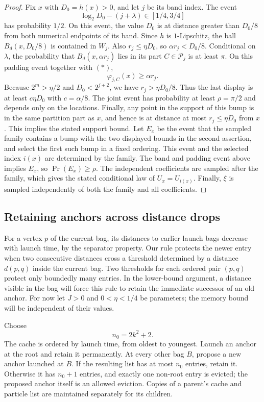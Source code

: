 \begin{proof}
Fix $x$ with $D_0=h(x)>0$, and let $j$ be its band index. The event
\[
  \log_2D_0-(j+\lambda)\in[1/4,3/4]
  \tag{*}
\]
has probability $1/2$. On this event, the value $D_0$ is at distance
greater than $D_0/8$ from both numerical endpoints of its band. Since
$h$ is $1$-Lipschitz, the ball $B_d(x,D_0/8)$ is contained in $W_j$.
Also $r_j\leq\eta D_0$, so $\alpha r_j<D_0/8$.
Conditional on $\lambda$, the probability that
$B_d(x,\alpha r_j)$ lies in its part $C\in\mathcal P_j$ is at least
$\pi$. On this padding event together with $(*)$,
\[
  \varphi_{j,C}(x)\geq\alpha r_j.
\]
Because $2^m>\eta/2$ and $D_0<2^{j+2}$, we have
$r_j>\eta D_0/8$. Thus the last display is at least
$c\eta D_0$ with $c=\alpha/8$. The joint event has probability at
least $\rho=\pi/2$ and depends only on the locations.
Finally, any point in the support of this bump is in the same partition
part as $x$, and hence is at distance at most
$r_j\leq\eta D_0$ from $x$. This implies the stated support bound.
Let $E_x$ be the event that the sampled family contains a bump with
the two displayed bounds in the second assertion, and select the first such
bump in a fixed ordering. This event and the selected index $i(x)$
are determined by the family. The band and padding event above implies
$E_x$, so $\Pr(E_x)\geq\rho$. The independent coefficients are
sampled after the family, which gives the stated conditional law of
$U_x=U_{i(x)}$. Finally, $\xi$ is sampled independently of both the
family and all coefficients.
\end{proof}

\subsection{Retaining anchors across distance drops}

For a vertex $p$ of the current bag, its distances to earlier launch
bags decrease with launch time, by the separator property. Our rule
protects the newer entry when two consecutive distances cross a
threshold determined by a distance $d(p,q)$ inside the current bag.
Two thresholds for each ordered pair $(p,q)$ protect only boundedly
many entries. In the lower-bound argument, a distance visible in the
bag will force this rule to retain the immediate successor of an old
anchor. For now let $J>0$ and $0<\eta<1/4$ be parameters; the memory
bound will be independent of their values.


Choose
\[
 n_0=2k^2+2.
\]
The cache is ordered by launch time, from oldest to youngest.  Launch an
anchor at the root and retain it permanently.  At every other bag $B$,
propose a new anchor launched
at $B$.  If the resulting list has at most $n_0$ entries, retain it.
Otherwise it has $n_0+1$ entries, and exactly one non-root entry is evicted;
the proposed anchor itself is an allowed eviction.  Copies of a parent's
cache and particle list are maintained separately for its children.

